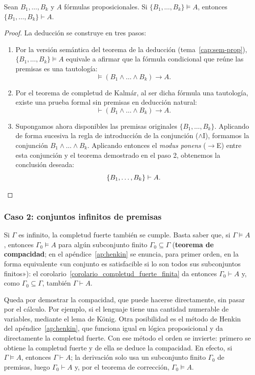\begin{corollary}\label{corolario_completud_fuerte_finita}
Sean $B_1, \dots, B_k$ y $A$ fórmulas proposicionales. Si $\{B_1, \dots, B_k\} \models A$, entonces $\{B_1, \dots, B_k\} \vdash A$.
\end{corollary}
\begin{proof}
La deducción se construye en tres pasos:
\begin{enumerate}
    \item Por la versión semántica del teorema de la deducción (tema~\ref{cap:sem-prop}), $\{B_1, \dots, B_k\} \models A$ equivale a afirmar que la fórmula condicional que reúne las premisas es una tautología:
    \[
    \models (B_1 \land \dots \land B_k) \to A.
    \]
    \item Por el teorema de completud de Kalmár, al ser dicha fórmula una tautología, existe una prueba formal sin premisas en deducción natural:
    \[
    \vdash (B_1 \land \dots \land B_k) \to A.
    \]
    \item Supongamos ahora disponibles las premisas originales $\{B_1, \dots, B_k\}$. Aplicando de forma sucesiva la regla de introducción de la conjunción ($\land$I), formamos la conjunción $B_1 \land \dots \land B_k$. Aplicando entonces el \emph{modus ponens} ($\to$E) entre esta conjunción y el teorema demostrado en el paso 2, obtenemos la conclusión deseada:
    \[
    \{B_1, \dots, B_k\} \vdash A.
    \qedhere
    \]
\end{enumerate}
\end{proof}

\subsubsection{Caso 2: conjuntos infinitos de premisas\ampliacion}

Si $\Gamma$ es infinito, la completud fuerte también se cumple. Basta saber que, si $\Gamma \models A$, entonces $\Gamma_0 \models A$ para algún subconjunto finito $\Gamma_0 \subseteq \Gamma$ (\textbf{teorema de compacidad}; en el apéndice~\ref{ap:henkin} se enuncia, para primer orden, en la forma equivalente «un conjunto es satisfacible si lo son todos sus subconjuntos finitos»): el corolario~\ref{corolario_completud_fuerte_finita} da entonces $\Gamma_0 \vdash A$ y, como $\Gamma_0 \subseteq \Gamma$, también $\Gamma \vdash A$.

Queda por demostrar la compacidad, que puede hacerse directamente, sin
pasar por el cálculo. Por ejemplo, si el lenguaje tiene una cantidad
numerable de variables, mediante el lema de König. Otra posibilidad es
el método de Henkin del apéndice~\ref{ap:henkin}, que funciona igual
en lógica proposicional y da directamente la completud fuerte. Con ese
método el orden se invierte: primero se obtiene la completud fuerte y
de ella se deduce la compacidad. En efecto, si $\Gamma \models A$,
entonces $\Gamma \vdash A$; la derivación solo usa un subconjunto
finito $\Gamma_0$ de premisas, luego $\Gamma_0 \vdash A$ y, por el
teorema de corrección, $\Gamma_0 \models A$. 

